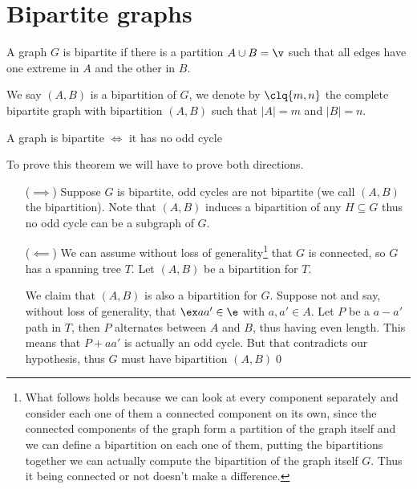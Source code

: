 \section{Bipartite graphs}
\begin{definition}
    A graph $G$ is bipartite if there is a partition $A \cup B = \v$ such that all edges have one extreme in $A$ and the other in $B$.
\end{definition}
We say $(A, B)$ is a bipartition of $G$, we denote by $\clq{m, n}$ the complete bipartite graph with bipartition $(A, B)$ such that $|A| = m$ and $|B| = n$.
\begin{customproposition}{1.24}
    \label{proposition:1.24}
    A graph is bipartite $\iff$ it has no odd cycle
\end{customproposition}
\begin{prf}
    To prove this theorem we will have to prove both directions.
    \begin{itemize}
        \item [($\implies$)] Suppose $G$ is bipartite, odd cycles are not bipartite (we call $(A, B)$ the bipartition). Note that $(A, B)$ induces a bipartition of any $H \subseteq G$ thus no odd cycle can be a subgraph of $G$.
        \item [($\impliedby$)] We can assume without loss of generality\footnote{What follows holds because we can look at every component separately and consider each one of them a connected component on its own, since the connected components of the graph form a partition of the graph itself and we can define a bipartition on each one of them, putting the bipartitions together we can actually compute the bipartition of the graph itself $G$. Thus it being connected or not doesn't make a difference.} that $G$ is connected, so $G$ has a spanning tree $T$. Let $(A, B)$ be a bipartition for $T$.
        
        We claim that $(A, B)$ is also a bipartition for $G$. Suppose not and say, without loss of generality, that $\ex aa' \in \e$ with $a, a' \in A$. Let $P$ be a $a - a'$ path in $T$, then $P$ alternates between $A$ and $B$, thus having even length. This means that $P + aa'$ is actually an odd cycle. But that contradicts our hypothesis, thus $G$ must have bipartition $(A, B)$\qed
    \end{itemize}
\end{prf}
